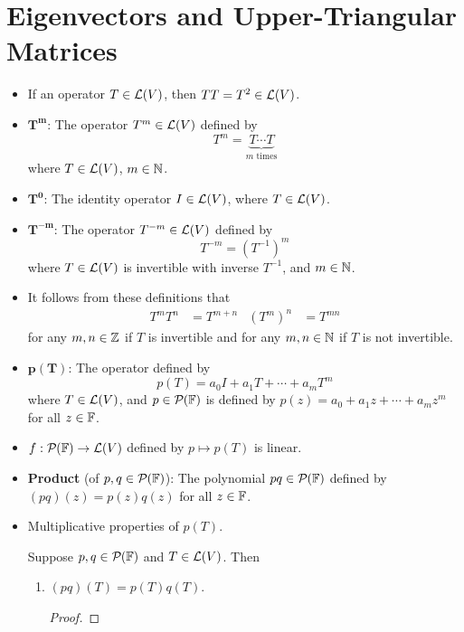 \documentclass[../main.tex]{subfiles}
\begin{document}
\section{Eigenvectors and Upper-Triangular Matrices}
\begin{itemize}
    \item {}If an operator $T\in\mathcal{L}(V)$, then $TT=T^2\in\mathcal{L}(V)$.
    \item $\bm{T^m}$: The operator $T^m\in\mathcal{L}(V)$ defined by
    \begin{equation*}
        T^m = \underbrace{T\cdots T}_\text{$m$ times}
    \end{equation*}
    where $T\in\mathcal{L}(V)$, $m\in\mathbb{N}$.
    \item $\bm{T^0}$: The identity operator $I\in\mathcal{L}(V)$, where $T\in\mathcal{L}(V)$.
    \item $\bm{T^{-m}}$: The operator $T^{-m}\in\mathcal{L}(V)$ defined by
    \begin{equation*}
        T^{-m} = (T^{-1})^m
    \end{equation*}
    where $T\in\mathcal{L}(V)$ is invertible with inverse $T^{-1}$, and $m\in\mathbb{N}$.
    \item It follows from these definitions that
    \begin{align*}
        T^mT^n &= T^{m+n}&
        (T^m)^n &= T^{mn}
    \end{align*}
    for any $m,n\in\mathbb{Z}$ if $T$ is invertible and for any $m,n\in\mathbb{N}$ if $T$ is not invertible.
    \item $\bm{p(T)}$: The operator defined by
    \begin{equation*}
        p(T) = a_0I+a_1T+\cdots+a_mT^m
    \end{equation*}
    where $T\in\mathcal{L}(V)$, and $p\in\mathcal{P}_{}(\mathbb{F})$ is defined by $p(z) = a_0+a_1z+\cdots+a_mz^m$ for all $z\in\mathbb{F}$.
    \item $f:\mathcal{P}_{}(\mathbb{F})\to\mathcal{L}(V)$ defined by $p\mapsto p(T)$ is linear.
    \item \textbf{Product} (of $p,q\in\mathcal{P}_{}(\mathbb{F})$): The polynomial $pq\in\mathcal{P}_{}(\mathbb{F})$ defined by $(pq)(z)=p(z)q(z)$ for all $z\in\mathbb{F}$.
    \item Multiplicative properties of $p(T)$.
    \begin{theorem}\label{trm:polTMultiplicative}
        Suppose $p,q\in\mathcal{P}_{}(\mathbb{F})$ and $T\in\mathcal{L}(V)$. Then
        \begin{enumerate}[label={\textup{(}\alph*\textup{)}}]
            \item $(pq)(T)=p(T)q(T)$.
            \begin{proof}

\end{proof}
\end{enumerate}
\end{theorem}
\end{itemize}
\end{document}

